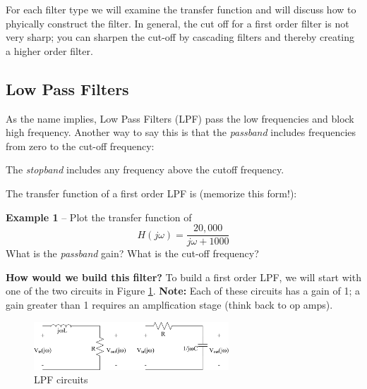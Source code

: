 \documentclass{handout}
\begin{document}
For each filter type we will examine the transfer function and will discuss how to phyically construct the filter.  In general, the cut off for a first order filter is not very sharp; you can sharpen the cut-off by cascading filters and thereby creating a higher order filter.



\subsection{Low Pass Filters}
As the name implies, Low Pass Filters (LPF) pass the low frequencies and block high frequency.  Another way to say this is that the {\em passband} includes frequencies from zero to the cut-off frequency:

The {\em stopband} includes any frequency above the cutoff frequency.

The transfer function of a first order LPF is (memorize this form!):

\newpage
\clearpage
\pagebreak

\textbf{Example 1} -- Plot the transfer function of
\[
H(j\omega) = \frac{20,000}{j\omega +1000}
\]
What is the {\em passband} gain? What is the cut-off frequency?

\textbf{How would we build this filter?}  To build a first order LPF, we will start with one of the two circuits in Figure \ref{fig: LPF}. \textbf{Note:} Each of these circuits has a gain of 1; a gain greater than 1 requires an amplfication stage (think back to op amps).
\begin{figure} [h!]
\centering
\includegraphics[width=0.65\textwidth]{LPF.jpg}
\caption{LPF circuits}
\label{fig: LPF}
\end{figure}
\end{document}

